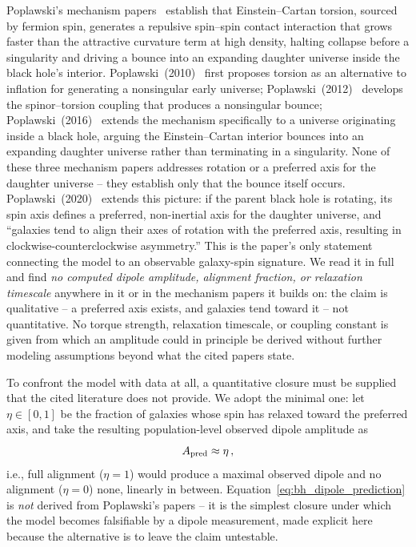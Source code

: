 \documentclass[twocolumn,linenumbers]{aastex702}
\begin{document}
Poplawski's mechanism papers~\cite{Poplawski:2010,Poplawski:2012,Poplawski:2016}
establish that Einstein--Cartan torsion, sourced by fermion spin, generates
a repulsive spin--spin contact interaction that grows faster than the
attractive curvature term at high density, halting collapse before a
singularity and driving a bounce into an expanding daughter universe inside
the black hole's interior. Poplawski~(2010)~\cite{Poplawski:2010} first
proposes torsion as an alternative to inflation for generating a nonsingular
early universe; Poplawski~(2012)~\cite{Poplawski:2012} develops the
spinor--torsion coupling that produces a nonsingular bounce; Poplawski~(2016)~\cite{Poplawski:2016}
extends the mechanism specifically to a universe originating inside a black
hole, arguing the Einstein--Cartan interior bounces into an expanding
daughter universe rather than terminating in a singularity. None of these
three mechanism papers addresses rotation or a preferred axis for the
daughter universe -- they establish only that the bounce itself occurs.
Poplawski~(2020)~\cite{Poplawski:2020} extends this picture: if the parent
black hole is rotating, its spin axis defines a preferred, non-inertial
axis for the daughter universe, and ``galaxies tend to align their axes of
rotation with the preferred axis, resulting in clockwise-counterclockwise
asymmetry.'' This is the paper's only statement connecting the model to an
observable galaxy-spin signature. We read it in full and find \emph{no
computed dipole amplitude, alignment fraction, or relaxation timescale}
anywhere in it or in the mechanism papers it builds on: the claim is
qualitative -- a preferred axis exists, and galaxies tend toward it -- not
quantitative. No torque strength, relaxation timescale, or coupling
constant is given from which an amplitude could in principle be derived
without further modeling assumptions beyond what the cited papers state.

To confront the model with data at all, a quantitative closure must be
supplied that the cited literature does not provide. We adopt the minimal
one: let $\eta\in[0,1]$ be the fraction of galaxies whose spin has
relaxed toward the preferred axis, and take the resulting population-level
observed dipole amplitude as
\begin{equation}
A_{\rm pred} \approx \eta\,,
\label{eq:bh_dipole_prediction}
\end{equation}
i.e., full alignment ($\eta=1$) would produce a maximal observed dipole and
no alignment ($\eta=0$) none, linearly in between. Equation~\ref{eq:bh_dipole_prediction}
is \emph{not} derived from Poplawski's papers -- it is the simplest closure
under which the model becomes falsifiable by a dipole measurement, made
explicit here because the alternative is to leave the claim untestable.
\end{document}
